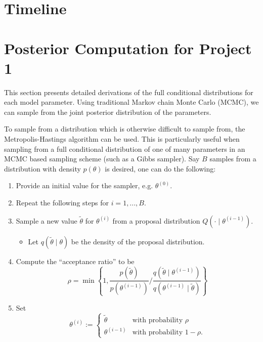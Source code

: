 \documentclass[12pt,]{article}
\providecommand{\tightlist}{%
  \setlength{\itemsep}{0pt}\setlength{\parskip}{0pt}}
\newcommand{\bc}[1]{ \left\{#1\right\} }
\newcommand{\bZ}{\mbox{\boldmath $Z$}}
\begin{document}


\section{Timeline}\label{sec:time}

%



\appendix
\section{Posterior Computation for Project 1}
This section presents detailed derivations of the full conditional
distributions for each model parameter. Using traditional Markov
chain Monte Carlo (MCMC), we can sample from the joint posterior 
distribution of the parameters.

To sample from a distribution which is otherwise difficult to sample
from, the Metropolis-Hastings algorithm can be used. This is
particularly useful when sampling from a full conditional distribution
of one of many parameters in an MCMC based sampling scheme (such as a
Gibbs sampler). Say \(B\) samples from a distribution with density
\(p(\theta)\) is desired, one can do the following:

\begin{enumerate}
\def\labelenumi{\arabic{enumi}.}
\tightlist
\item
  Provide an initial value for the sampler, e.g. \(\theta^{(0)}\).
\item
  Repeat the following steps for \(i = 1,...,B\).
\item
  Sample a new value \(\tilde\theta\) for \(\theta^{(i)}\) from a
  proposal distribution \(Q(\cdot \mid \theta^{(i-1)})\).

  \begin{itemize}
  \tightlist
  \item
    Let \(q(\tilde\theta \mid \theta)\) be the density of the proposal
    distribution.
  \end{itemize}
\item
  Compute the ``acceptance ratio'' to be \[
     \rho=
     \min\bc{1, \frac{p(\tilde\theta)}{p(\theta^{(i-1)})} \Big/ 
            \frac{q(\tilde\theta\mid\theta^{(i-1)})}
                 {q(\theta^{(i-1)}\mid\tilde\theta)}
        }
     \]
\item
  Set \[
     \theta^{(i)} := 
     \begin{cases}
     \tilde\theta &\text{with probability } \rho \\
     \theta^{(i-1)} &\text{with probability } 1-\rho.
     \end{cases}
     \]
\end{enumerate}
\end{document}
